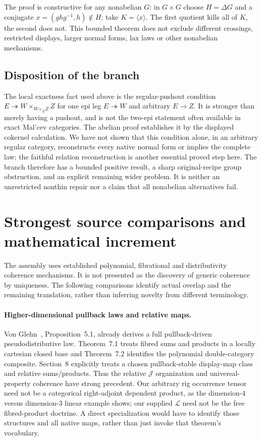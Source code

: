 \documentclass[11pt,a4paper]{article}
\theoremstyle{definition}
\newcommand{\Lcat}{\mathcal L}
\newcommand{\J}{\mathcal J}
\begin{document}
The proof is constructive for any nonabelian $G$: in $G\times G$ choose
$H=\Delta G$ and a conjugate $x=(ghg^{-1},h)\notin H$; take $K=\langle x\rangle$.
The first quotient kills all of $K$, the second does not. This bounded theorem
does not exclude different crossings, restricted displays, larger normal
forms, lax laws or other nonabelian mechanisms.

\subsection{Disposition of the branch}
The local exactness fact used above is the regular-pushout condition
$E\twoheadrightarrow W\times_{W+_EZ}Z$ for one epi leg $E\twoheadrightarrow W$
and arbitrary $E\to Z$. It is stronger than merely having a pushout, and is
not the two-epi statement often available in exact Mal'cev categories.
The abelian proof establishes it by the displayed cokernel calculation.
We have not shown that this condition alone, in an arbitrary regular category,
reconstructs every native normal form or implies the complete law; the faithful
relation reconstruction is another essential proved step here.
The branch therefore has a bounded positive result, a sharp original-recipe
group obstruction, and an explicit remaining wider problem. It is neither an
unrestricted nonthin repair nor a claim that all nonabelian alternatives fail.

\section{Strongest source comparisons and mathematical increment}\label{sec:sources}

The assembly uses established polynomial, fibrational and distributivity
coherence mechanisms. It is not presented as the discovery of generic
coherence by uniqueness. The following comparisons identify actual overlap
and the remaining translation, rather than inferring novelty from different
terminology.

\paragraph{Higher-dimensional pullback laws and relative maps.}
Von Glehn~\cite{vonGlehn}, Proposition~5.1, already derives a full
pullback-driven pseudodistributive law. Theorem~7.1 treats fibred sums and
products in a locally cartesian closed base and Theorem~7.2 identifies the
polynomial double-category composite. Section~8 explicitly treats a chosen
pullback-stable display-map class and relative sums/products. Thus the relative
$\J$ organization and universal-property coherence have strong precedent.
Our arbitrary rig occurrence tensor need not be a categorical right-adjoint
dependent product, as the dimension-$4$ versus dimension-$3$ linear example
shows; our supplied $\Lcat$ need not be the free fibred-product doctrine.
A direct specialization would have to identify those structures and all native
maps, rather than just invoke that theorem's vocabulary.
\end{document}
